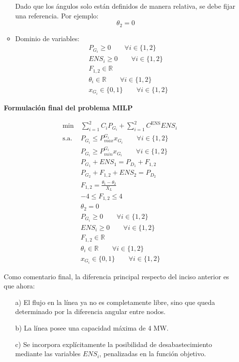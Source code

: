 \begin{enumerate}
\begin{itemize}
    Dado que los ángulos solo están definidos de manera relativa, se debe fijar una referencia. Por ejemplo:
    \begin{equation}
        \theta_2 = 0
    \end{equation}

    \item Dominio de variables:
    \begin{align}
        &P_{G_i}\geq 0 \qquad \forall i\in\{1,2\} \\
        &ENS_i\geq 0 \qquad \forall i\in\{1,2\} \\
        &F_{1,2}\in\mathbb{R} \\
        &\theta_i\in\mathbb{R} \qquad \forall i\in\{1,2\} \\
        &x_{G_i}\in\{0,1\} \qquad \forall i\in\{1,2\}
    \end{align}
\end{itemize}

\textbf{Formulación final del problema MILP}

\[
\begin{aligned}
\min \ & \sum_{i=1}^{2} C_i P_{G_i} + \sum_{i=1}^{2} C^{\text{ENS}} ENS_i \\
\text{s.a. } 
& P_{G_i} \leq P_{max}^{G_i}x_{G_i} \qquad \forall i\in\{1,2\} \\
& P_{G_i} \geq P_{min}^{G_i}x_{G_i} \qquad \forall i\in\{1,2\} \\
& P_{G_1} + ENS_1 = P_{D_1} + F_{1,2} \\
& P_{G_2} + F_{1,2} + ENS_2 = P_{D_2} \\
& F_{1,2} = \frac{\theta_1-\theta_2}{X_L} \\
& -4 \leq F_{1,2} \leq 4 \\
& \theta_2 = 0 \\
& P_{G_i}\geq 0 \qquad \forall i\in\{1,2\} \\
& ENS_i\geq 0 \qquad \forall i\in\{1,2\} \\
& F_{1,2}\in\mathbb{R} \\
& \theta_i\in\mathbb{R} \qquad \forall i\in\{1,2\} \\
& x_{G_i}\in\{0,1\} \qquad \forall i\in\{1,2\}
\end{aligned}
\]


Como comentario final, la diferencia principal respecto del inciso anterior es que ahora:
\begin{enumerate}
    \item[a)] El flujo en la línea ya no es completamente libre, sino que queda determinado por la diferencia angular entre nodos.
    \item[b)] La línea posee una capacidad máxima de 4 MW.
    \item[c)] Se incorpora explícitamente la posibilidad de desabastecimiento mediante las variables $ENS_i$, penalizadas en la función objetivo.
\end{enumerate}


\end{enumerate}
